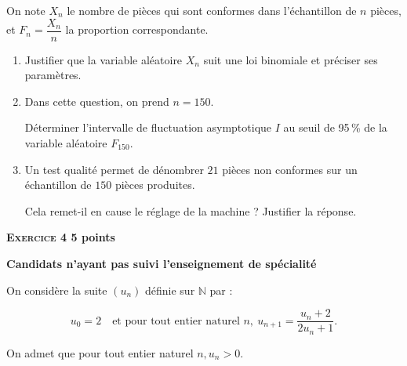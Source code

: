 \documentclass[10pt]{article}
\newcommand{\N}{\mathbb{N}}
\begin{document}
\begin{enumerate}
On note $X_{n}$ le nombre de pièces qui sont conformes dans l'échantillon de $n$ pièces, et  $F_{n} = \dfrac{X_{n}}{n}$ la proportion correspondante.
	\begin{enumerate}
		\item Justifier que la variable aléatoire $X_{n}$ suit une loi binomiale et préciser ses paramètres. 
		\item Dans cette question, on prend $n = 150$.
		 
Déterminer l'intervalle de fluctuation asymptotique $I$ au seuil de 95\,\% de la variable aléatoire $F_{150}$. 
		\item Un test qualité permet de dénombrer $21$ pièces non conformes sur un échantillon de $150$ pièces produites.
		 
Cela remet-il en cause le réglage de la machine ? Justifier la réponse.
	\end{enumerate} 
\end{enumerate}

\vspace{0,5cm}

\textbf{\textsc{Exercice 4} \hfill 5 points}
 
\textbf{Candidats n'ayant pas suivi l'enseignement de spécialité}

\medskip

 
On considère la suite $\left(u_{n}\right)$ définie sur $\N$ par : 

\[u_{0} = 2\quad  \text{et pour tout entier naturel } n,\: u_{n+1} = \dfrac{u_{n}+ 2}{2u_{n} + 1}.\] 

On admet que pour tout entier naturel $n, u_{n} > 0$.

\medskip
 
\end{document}
